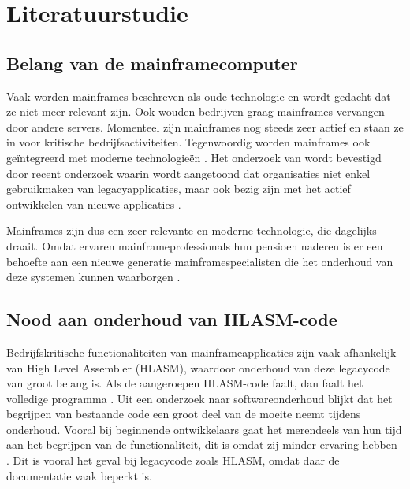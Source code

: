
\section{Literatuurstudie}%
\label{sec:literatuurstudie}

\subsection{Belang van de mainframecomputer}

Vaak worden mainframes beschreven als oude technologie en wordt gedacht dat ze niet meer relevant zijn. Ook wouden bedrijven graag mainframes vervangen door andere servers. Momenteel zijn mainframes nog steeds zeer actief en staan ze in voor kritische bedrijfsactiviteiten. Tegenwoordig worden mainframes ook geïntegreerd met moderne technologieën \autocite{Sagers_Ball_Hosack_Twitchell_Wallace_2018}. Het onderzoek van \textcite{Sagers_Ball_Hosack_Twitchell_Wallace_2018} wordt bevestigd door recent onderzoek waarin wordt aangetoond dat organisaties niet enkel gebruikmaken van legacyapplicaties, maar ook bezig zijn met het actief ontwikkelen van nieuwe applicaties \autocite{shaik_2024}.

Mainframes zijn dus een zeer relevante en moderne technologie, die dagelijks draait. Omdat ervaren mainframeprofessionals hun pensioen naderen is er een behoefte aan een nieuwe generatie mainframespecialisten die het onderhoud van deze systemen kunnen waarborgen \autocite{waites_ketterer_2013}. 


\subsection{Nood aan onderhoud van HLASM-code}

Bedrijfskritische functionaliteiten van mainframeapplicaties zijn vaak afhankelijk van High Level Assembler (HLASM), waardoor onderhoud van deze legacycode van groot belang is. Als de aangeroepen HLASM-code faalt, dan faalt het volledige programma \autocite{zaytsev_2020}. Uit een onderzoek naar softwareonderhoud blijkt dat het begrijpen van bestaande code een groot deel van de moeite neemt tijdens onderhoud. Vooral bij beginnende ontwikkelaars gaat het merendeels van hun tijd aan het begrijpen van de functionaliteit, dit is omdat zij minder ervaring hebben \autocite{xia_bao_lo_xing_hassan_li_2018}. Dit is vooral het geval bij legacycode zoals HLASM, omdat daar de documentatie vaak beperkt is.

